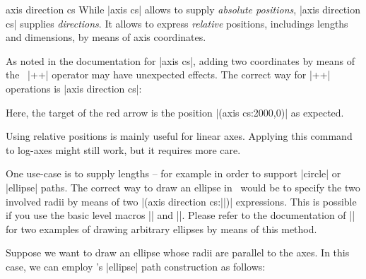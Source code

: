 \begin{coordinatesystem}{axis direction cs}
	While |axis cs| allows to supply \emph{absolute positions}, |axis direction cs| supplies \emph{directions}. It allows to express \emph{relative} positions, includings lengths and dimensions, by means of axis coordinates.

	As noted in the documentation for |axis cs|, adding two coordinates by means of the \tikzname\ |++| operator may have unexpected effects. The correct way for |++| operations is |axis direction cs|:
\begin{codeexample}[]
\end{codeexample}
	\noindent Here, the target of the red arrow is the position |(axis cs:2000,0)| as expected.

	Using relative positions is mainly useful for linear axes. Applying this command to log-axes might still work, but it requires more care.

	One use-case is to supply lengths -- for example in order to support |circle| or |ellipse| paths. The correct way to draw an ellipse in \PGFPlots\ would be to specify the two involved radii by means of two |(axis direction cs:||)| expressions. This is possible if you use the basic level macros |\pgfpathellipse| and |\pgfplotspointaxisdirectionxy|. Please refer to the documentation of |\pgfplotspointaxisdirectionxy| for two examples of drawing arbitrary ellipses by means of this method. 
	
	Suppose we want to draw an ellipse whose radii are parallel to the axes. In this case, we can employ \tikzname's |ellipse| path construction as follows:
\begin{codeexample}[]
\end{codeexample}
\end{coordinatesystem}
